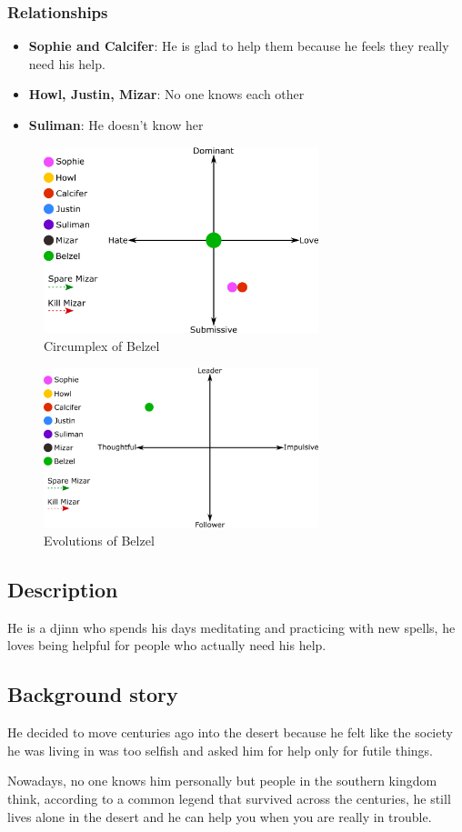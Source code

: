 \subsubsection*{Relationships}
\begin{itemize}
\item \textbf{Sophie and Calcifer}: He  is glad to help them because he feels they really need his help.
\item \textbf{Howl, Justin, Mizar}: No one knows each other
\item \textbf{Suliman}: He doesn’t know her
\end{itemize}

\begin{figure}[H]
  \centering
  \includegraphics[width=8cm]{Images/SVG/Exported/Circumplexes/belzelCircumplex}
  \caption{Circumplex of Belzel}
\end{figure}

\begin{figure}[H]
   \centering
   \includegraphics[width=8cm]{Images/SVG/Exported/Evolutions/belzelEvolution}
   \caption{Evolutions of Belzel}
\end{figure}

\subsection{Description}
He is a djinn who spends his days meditating and practicing with new spells, he loves being helpful for people who actually need his help. 

\subsection{Background story}
He decided to move centuries ago into the desert because he felt like the society he was living in was too selfish and asked him for help only for futile things.

Nowadays, no one knows him personally but people in the southern kingdom think, according to a common legend that survived across the centuries, he still lives alone in the desert and he can help you when you are really in trouble.
